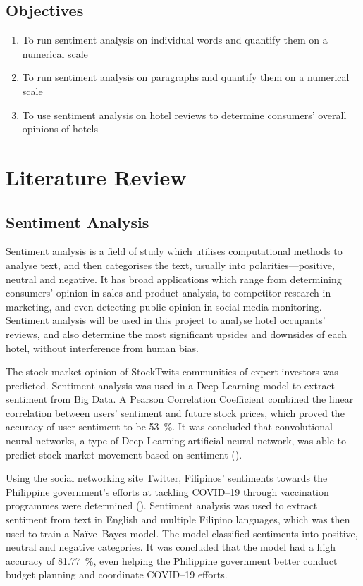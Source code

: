 \documentclass[
	fontsize=12pt,
	paper=a4,
	bibliography=totocnumbered, 
]{scrartcl}
\begin{document}
\subsection{Objectives}
\begin{enumerate}
	\item To run sentiment analysis on individual words and quantify them on a numerical scale
	\item To run sentiment analysis on paragraphs and quantify them on a numerical scale
	\item To use sentiment analysis on hotel reviews to determine consumers' overall opinions of hotels
\end{enumerate}

\section{Literature Review}

\subsection{Sentiment Analysis}

Sentiment analysis is a field of study which utilises computational methods to analyse text,
and then categorises the text, usually into polarities---positive, neutral
and negative. It has broad applications which range from determining consumers' opinion in
sales and product analysis, to competitor research in marketing, and even detecting public
opinion in social media monitoring. Sentiment analysis will be used in this project to
analyse hotel occupants' reviews, and also determine the most significant upsides
and downsides of each hotel, without interference from human bias.

The stock market opinion of StockTwits communities
of expert investors was predicted. Sentiment analysis was used in a Deep Learning model to extract
sentiment from Big Data. A Pearson Correlation Coefficient combined the linear correlation
between users' sentiment and future stock prices, which
proved the accuracy of user sentiment to be \qty{53}{\percent}.
It was concluded that convolutional neural networks, a type of Deep Learning
artificial neural network, was able to predict stock market movement based on sentiment (\cite{stock}).

Using the social networking site Twitter,
Filipinos' sentiments towards the Philippine government's efforts
at tackling COVID--19 through vaccination programmes were determined (\cite{twitter}).
Sentiment analysis was used to extract sentiment from text in English and multiple Filipino languages,
which was then used to train a Na{\"i}ve--Bayes model. The model classified
sentiments into positive, neutral and negative categories. It was concluded that
the model had a high accuracy of \qty{81.77}{\percent}, even helping the
Philippine government better conduct budget planning and coordinate COVID--19 efforts.
\end{document}
